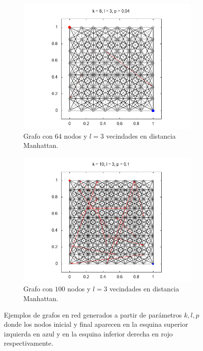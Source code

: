 \documentclass{article}
\begin{document}
\begin{figure}[h]
    \begin{subfigure}[b]{0.45\textwidth}
      \includegraphics[width=\textwidth]{k064l003p040}
      \caption{Grafo con $64$ nodos y $l = 3$ vecindades en distancia Manhattan.}
      \label{fig:c}
    \end{subfigure}
    \begin{subfigure}[b]{0.45\textwidth}
      \includegraphics[width=\textwidth]{k100l003p100}
      \caption{Grafo con $100$ nodos y $l = 3$ vecindades en distancia Manhattan.}
          \label{fig:d}
    \end{subfigure}
    \caption{Ejemplos de grafos en red generados a partir de parámetros $k, l, p$ donde los nodos inicial y final aparecen en la esquina superior izquierda en azul y en la esquina inferior derecha en rojo respectivamente.}\label{ejemplosGrafos}
\end{figure}
\end{document}
